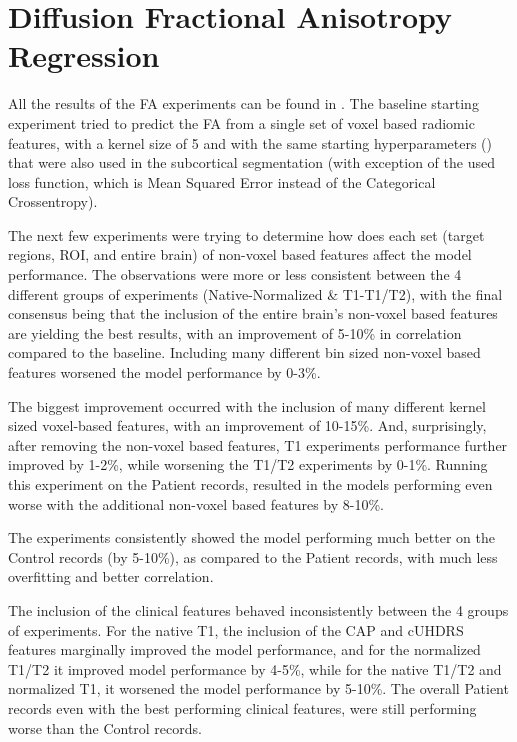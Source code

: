 \section{Diffusion Fractional Anisotropy Regression}

All the results of the \ac{FA} experiments can be found in  .
The baseline starting experiment tried to predict the \ac{FA} from a single set of voxel based radiomic features, with a kernel size of 5 and with the same starting hyperparameters () that were also used in the subcortical segmentation (with exception of the used loss function, which is Mean Squared Error instead of the Categorical Crossentropy).\par
The next few experiments were trying to determine how does each set (target regions, \ac{ROI}, and entire brain) of non-voxel based features affect the model performance. The observations were more or less consistent between the 4 different groups of experiments (Native-Normalized \& T1-T1/T2), with the final consensus being that the inclusion of the entire brain's non-voxel based features are yielding the best results, with an improvement of 5-10\% in correlation compared to the baseline. Including many different bin sized non-voxel based features worsened the model performance by 0-3\%.\par
The biggest improvement occurred with the inclusion of many different kernel sized voxel-based features, with an improvement of 10-15\%. And, surprisingly, after removing the non-voxel based features, T1 experiments performance further improved by 1-2\%, while worsening the T1/T2 experiments by 0-1\%. Running this experiment on the Patient records, resulted in the models performing even worse with the additional non-voxel based features by 8-10\%.\par
The experiments consistently showed the model performing much better on the Control records (by 5-10\%), as compared to the Patient records, with much less overfitting and better correlation.\par
The inclusion of the clinical features behaved inconsistently between the 4 groups of experiments. For the native T1, the inclusion of the \ac{CAP} and \ac{cUHDRS} features marginally improved the model performance, and for the normalized T1/T2 it improved model performance by 4-5\%, while for the native T1/T2 and normalized T1, it worsened the model performance by 5-10\%. The overall Patient records even with the best performing clinical features, were still performing worse than the Control records.\par
